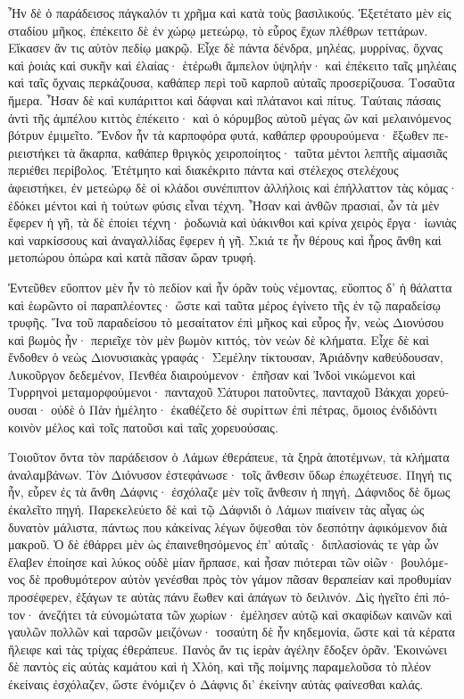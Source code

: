 \documentclass{book}
\begin{document}
\begin{pairs}
\begin{Leftside}
\begin{greek}
  Ἦν δὲ ὁ παράδεισος πάγκαλόν τι χρῆμα καὶ κατὰ τοὺς βασιλικούς. Ἐξετέτατο μὲν εἰς σταδίου μῆκος, ἐπέκειτο δὲ ἐν χώρῳ μετεώρῳ, τὸ εὖρος ἔχων πλέθρων τεττάρων.  Εἴκασεν ἄν τις αὐτὸν πεδίῳ μακρῷ. Εἶχε δὲ πάντα δένδρα, μηλέας, μυρρίνας, ὄχνας καὶ ῥοιὰς καὶ συκῆν καὶ ἐλαίας· ἑτέρωθι ἄμπελον ὑψηλήν· καὶ ἐπέκειτο ταῖς μηλέαις καὶ ταῖς ὄχναις περκάζουσα, καθάπερ περὶ τοῦ καρποῦ αὐταῖς προσερίζουσα.  Τοσαῦτα ἥμερα. Ἦσαν δὲ καὶ κυπάριττοι καὶ δάφναι καὶ πλάτανοι καὶ πίτυς. Ταύταις πάσαις ἀντὶ τῆς ἀμπέλου κιττὸς ἐπέκειτο· καὶ ὁ κόρυμβος αὐτοῦ μέγας ὢν καὶ μελαινόμενος βότρυν ἐμιμεῖτο.  Ἔνδον ἦν τὰ καρποφόρα φυτά, καθάπερ φρουρούμενα· ἔξωθεν περιειστήκει τὰ ἄκαρπα, καθάπερ θριγκὸς χειροποίητος· ταῦτα μέντοι λεπτῆς αἱμασιᾶς περιέθει περίβολος.  Ἐτέτμητο καὶ διακέκριτο πάντα καὶ στέλεχος στελέχους ἀφειστήκει, ἐν μετεώρῳ δὲ οἱ κλάδοι συνέπιπτον ἀλλήλοις καὶ ἐπήλλαττον τὰς κόμας· ἐδόκει μέντοι καὶ ἡ τούτων φύσις εἶναι τέχνη.  Ἦσαν καὶ ἀνθῶν πρασιαί, ὧν τὰ μὲν ἔφερεν ἡ γῆ, τὰ δὲ ἐποίει τέχνη· ῥοδωνιὰ καὶ ὑάκινθοι καὶ κρίνα χειρὸς ἔργα· ἰωνιὰς καὶ ναρκίσσους καὶ ἀναγαλλίδας ἔφερεν ἡ γῆ. Σκιά τε ἦν θέρους καὶ ἦρος ἄνθη καὶ μετοπώρου ὀπώρα καὶ κατὰ πᾶσαν ὥραν τρυφή.
\pend


  Ἐντεῦθεν εὔοπτον μὲν ἦν τὸ πεδίον καὶ ἦν ὁρᾶν τοὺς νέμοντας, εὔοπτος δ’ ἡ θάλαττα καὶ ἑωρῶντο οἱ παραπλέοντες· ὥστε καὶ ταῦτα μέρος ἐγίνετο τῆς ἐν τῷ παραδείσῳ τρυφῆς. Ἵνα τοῦ παραδείσου τὸ μεσαίτατον ἐπὶ μῆκος καὶ εὖρος ἦν, νεὼς Διονύσου καὶ βωμὸς ἦν· περιεῖχε τὸν μὲν βωμὸν κιττός, τὸν νεὼν δὲ κλήματα.  Εἶχε δὲ καὶ ἔνδοθεν ὁ νεὼς Διονυσιακὰς γραφάς· Σεμέλην τίκτουσαν, Ἀριάδνην καθεύδουσαν, Λυκοῦργον δεδεμένον, Πενθέα διαιρούμενον· ἐπῆσαν καὶ Ἰνδοὶ νικώμενοι καὶ Τυρρηνοὶ μεταμορφούμενοι· πανταχοῦ Σάτυροι πατοῦντες, πανταχοῦ Βάκχαι χορεύουσαι· οὐδὲ ὁ Πὰν ἠμέλητο· ἐκαθέζετο δὲ συρίττων ἐπὶ πέτρας, ὅμοιος ἐνδιδόντι κοινὸν μέλος καὶ τοῖς πατοῦσι καὶ ταῖς χορευούσαις.
\pend


  Τοιοῦτον ὄντα τὸν παράδεισον ὁ Λάμων ἐθεράπευε, τὰ ξηρὰ ἀποτέμνων, τὰ κλήματα ἀναλαμβάνων. Τὸν Διόνυσον ἐστεφάνωσε· τοῖς ἄνθεσιν ὕδωρ ἐπωχέτευσε. Πηγή τις ἦν, εὗρεν ἐς τὰ ἄνθη Δάφνις· ἐσχόλαζε μὲν τοῖς ἄνθεσιν ἡ πηγή, Δάφνιδος δὲ ὅμως ἐκαλεῖτο πηγή.  Παρεκελεύετο δὲ καὶ τῷ Δάφνιδι ὁ Λάμων πιαίνειν τὰς αἶγας ὡς δυνατὸν μάλιστα, πάντως που κἀκείνας λέγων ὄψεσθαι τὸν δεσπότην ἀφικόμενον διὰ μακροῦ.  Ὁ δὲ ἐθάρρει μὲν ὡς ἐπαινεθησόμενος ἐπ’ αὐταῖς· διπλασίονάς τε γὰρ ὧν ἔλαβεν ἐποίησε καὶ λύκος οὐδὲ μίαν ἥρπασε, καὶ ἦσαν πιότεραι τῶν οἰῶν· βουλόμενος δὲ προθυμότερον αὐτὸν γενέσθαι πρὸς τὸν γάμον πᾶσαν θεραπείαν καὶ προθυμίαν προσέφερεν, ἐξάγων τε αὐτὰς πάνυ ἕωθεν καὶ ἀπάγων τὸ δειλινόν.  Δὶς ἡγεῖτο ἐπὶ πότον· ἀνεζήτει τὰ εὐνομώτατα τῶν χωρίων· ἐμέλησεν αὐτῷ καὶ σκαφίδων καινῶν καὶ γαυλῶν πολλῶν καὶ ταρσῶν μειζόνων· τοσαύτη δὲ ἦν κηδεμονία, ὥστε καὶ τὰ κέρατα ἤλειφε καὶ τὰς τρίχας ἐθεράπευε.  Πανὸς ἄν τις ἱερὰν ἀγέλην ἔδοξεν ὁρᾶν. Ἐκοινώνει δὲ παντὸς εἰς αὐτὰς καμάτου καὶ ἡ Χλόη, καὶ τῆς ποίμνης παραμελοῦσα τὸ πλέον ἐκείναις ἐσχόλαζεν, ὥστε ἐνόμιζεν ὁ Δάφνις δι’ ἐκείνην αὐτὰς φαίνεσθαι καλάς.
\pend



\end{greek}
\end{Leftside}
\end{pairs}
\end{document}

